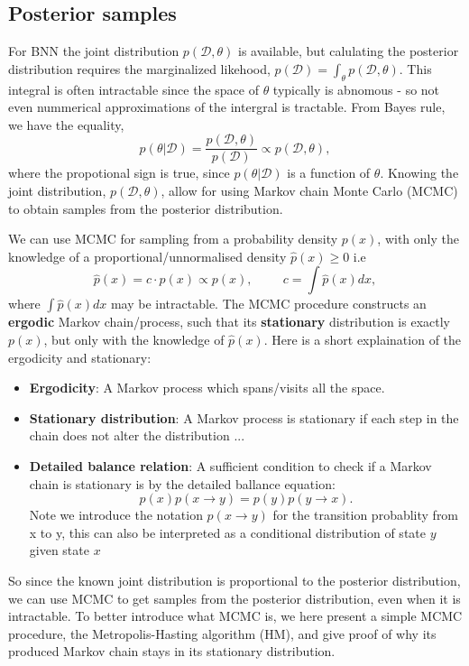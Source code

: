 \subsection*{Posterior samples}
For BNN the joint distribution $p(\mathcal{D},\theta)$ is available, but calulating the posterior
distribution requires the marginalized likehood, $p(\mathcal{D}) = \int_{\theta}
p(\mathcal{D},\theta)$. This integral is often intractable since the space of $\theta$ typically is
abnomous - so not even nummerical approximations of the intergral is tractable. From Bayes rule, we
have the equality, 
$$p(\theta|\mathcal{D}) = \frac{p(\mathcal{D},\theta)}{p(\mathcal{D})} \propto
p(\mathcal{D},\theta),$$ where the propotional sign is true, since $p(\theta|\mathcal{D})$ is a
function of $\theta$. Knowing the joint distribution, $p(\mathcal{D},\theta)$, allow for using Markov
chain Monte Carlo (MCMC) to obtain samples from the posterior distribution.  

\begin{testexample2}
    We can use MCMC for sampling from a probability density $p(x)$, with only the knowledge of a 
    proportional/unnormalised density $\hat p(x) \geq 0$ i.e
    $$\hat p(x) = c\cdot p(x) \propto p(x), \hspace{1cm} c = \int \hat p(x) dx,$$ where $\int \hat
    p(x) dx$ may be intractable. The MCMC procedure constructs an \textbf{ergodic} Markov
    chain/process, such that its \textbf{stationary} distribution is exactly $p(x)$, but only
    with the knowledge of $\hat p(x)$. Here is a short explaination of the ergodicity and stationary:
    \begin{itemize}[noitemsep]
        \item \textbf{Ergodicity}: A Markov process which spans/visits all the space. 
        \item \textbf{Stationary distribution}: A Markov process is stationary if each step
        in the chain does not alter the distribution ... 
        \item \textbf{Detailed balance relation}: A sufficient condition to check if a Markov chain
        is stationary is by the detailed ballance equation: $$p(x)p(x\rightarrow y) =
        p(y)p(y\rightarrow x).$$ Note we introduce the notation $p(x\rightarrow y)$ for the
        transition probablity from x to y, this can also be interpreted as a conditional
        distribution of state $y$ given state $x$  
    \end{itemize}
\end{testexample2}
So since the known joint distribution is proportional to the posterior distribution, we can use MCMC
to get samples from the posterior distribution, even when it is intractable. To better introduce
what MCMC is, we here present a simple MCMC procedure, the Metropolis-Hasting algorithm (HM), and
give proof of why its produced Markov chain stays in its stationary distribution.

